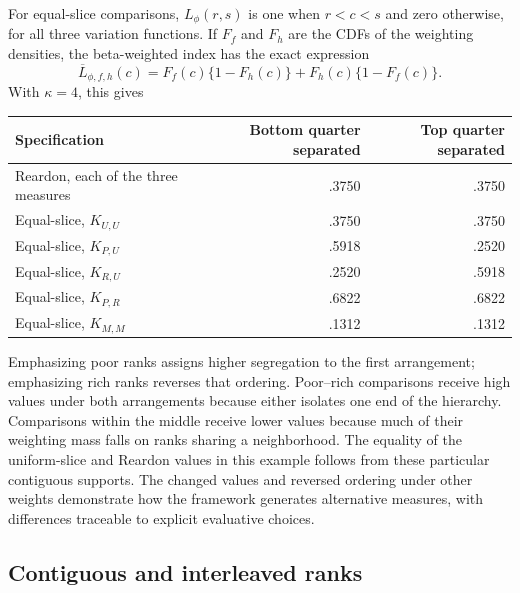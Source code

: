 \documentclass[11pt]{article}
\begin{document}
For equal-slice comparisons, $L_\phi(r,s)$ is one when $r<c<s$ and zero otherwise, for all three variation functions. If $F_f$ and $F_h$ are the CDFs of the weighting densities, the beta-weighted index has the exact expression
\begin{equation}
\overline L_{\phi,f,h}(c)
=F_f(c)\{1-F_h(c)\}+F_h(c)\{1-F_f(c)\}.
\label{eq:beta-example}
\end{equation}
With $\kappa=4$, this gives
\begin{center}
\begin{tabular}{lrr}
\toprule
Specification & Bottom quarter separated & Top quarter separated\\
\midrule
Reardon, each of the three measures & .3750 & .3750\\
Equal-slice, $K_{U,U}$ & .3750 & .3750\\
Equal-slice, $K_{P,U}$ & .5918 & .2520\\
Equal-slice, $K_{R,U}$ & .2520 & .5918\\
Equal-slice, $K_{P,R}$ & .6822 & .6822\\
Equal-slice, $K_{M,M}$ & .1312 & .1312\\
\bottomrule
\end{tabular}
\end{center}
Emphasizing poor ranks assigns higher segregation to the first arrangement; emphasizing rich ranks reverses that ordering. Poor--rich comparisons receive high values under both arrangements because either isolates one end of the hierarchy. Comparisons within the middle receive lower values because much of their weighting mass falls on ranks sharing a neighborhood. The equality of the uniform-slice and Reardon values in this example follows from these particular contiguous supports. The changed values and reversed ordering under other weights demonstrate how the framework generates alternative measures, with differences traceable to explicit evaluative choices.

\subsection{Contiguous and interleaved ranks}
\end{document}
